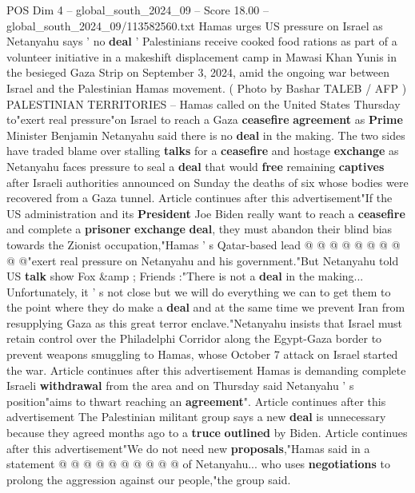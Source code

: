 \begin{textsample}{POS Dim 4 – global\_south\_2024\_09 – Score 18.00 – global\_south\_2024\_09/113582560.txt}  \label{ex:f4_pos_298}
Hamas urges US pressure on Israel as Netanyahu says ' no \textbf{deal} ' Palestinians receive cooked food rations as part of a volunteer initiative in a makeshift displacement camp in Mawasi Khan Yunis in the besieged Gaza Strip on September 3, 2024, amid the ongoing war between Israel and the Palestinian Hamas movement. ( Photo by Bashar TALEB / AFP ) PALESTINIAN TERRITORIES -- Hamas called on the United States Thursday to"exert real pressure"on Israel to reach a Gaza \textbf{ceasefire} \textbf{agreement} as \textbf{Prime} Minister Benjamin Netanyahu said there is no \textbf{deal} in the making.
The two sides have traded blame over stalling \textbf{talks} for a \textbf{ceasefire} and hostage \textbf{exchange} as Netanyahu faces pressure to seal a \textbf{deal} that would \textbf{free} remaining \textbf{captives} after Israeli authorities announced on Sunday the deaths of six whose bodies were recovered from a Gaza tunnel.
Article continues after this advertisement"If the US administration and its \textbf{President} Joe Biden really want to reach a \textbf{ceasefire} and complete a \textbf{prisoner} \textbf{exchange} \textbf{deal}, they must abandon their blind bias towards the Zionist occupation,"Hamas ' s Qatar-based lead @ @ @ @ @ @ @ @ @ @"exert real pressure on Netanyahu and his government."But Netanyahu told US \textbf{talk} show Fox \&amp ; Friends :"There is not a \textbf{deal} in the making...
Unfortunately, it ' s not close but we will do everything we can to get them to the point where they do make a \textbf{deal} and at the same time we prevent Iran from resupplying Gaza as this great terror enclave."Netanyahu insists that Israel must retain control over the Philadelphi Corridor along the Egypt-Gaza border to prevent weapons smuggling to Hamas, whose October 7 attack on Israel started the war.
Article continues after this advertisement Hamas is demanding complete Israeli \textbf{withdrawal} from the area and on Thursday said Netanyahu ' s position"aims to thwart reaching an \textbf{agreement}".
Article continues after this advertisement The Palestinian militant group says a new \textbf{deal} is unnecessary because they agreed months ago to a \textbf{truce} \textbf{outlined} by Biden.
Article continues after this advertisement"We do not need new \textbf{proposals},"Hamas said in a statement @ @ @ @ @ @ @ @ @ @ of Netanyahu... who uses \textbf{negotiations} to prolong the aggression against our people,"the group said.

\end{textsample}
